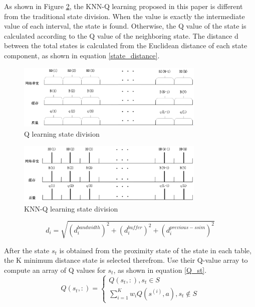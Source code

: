 \documentclass[twocolumn]{article}
\begin{document}
 As shown in Figure \ref{knn-q-learning state}, the KNN-Q learning proposed in this paper is 
 different from the traditional state division. 
 When the value is exactly the intermediate value of each interval, 
 the state is found. Otherwise, the Q value of the state is calculated 
 according to the Q value of the neighboring state.
 The distance d between the total states is calculated from the Euclidean distance of each state component,
  as shown in equation \ref{state_distance}.
\begin{figure}[ht]
\centering
\includegraphics[width=0.8\textwidth]{q-state}
\caption{Q learning state division}
\label{q-learning state}
\end{figure}
\begin{figure}[ht]
\centering
\includegraphics[width=0.8\textwidth]{knn-q-state}
\caption{KNN-Q learning state division}
\label{knn-q-learning state}
\end{figure}
\begin{equation}
\label{state_distance}
d_{i}=\sqrt{(d_{i}^{bandwidth})^2+(d_{i}^{buffer})^2+(d_{i}^{previous-ssim})^2}
\end{equation}

After the state $s_{t}$ is obtained from the proximity state of the state in each table, 
the K minimum distance state is selected therefrom. Use their Q-value array to compute an 
array of Q values for $s_{t}$, as shown in equation \ref{Q_st}.
\begin{equation}
\label{Q_st}
Q(s_{t},:)=\left\{
\begin{array}{lr}
    Q(s_{t},:),s_{t}\in S\\
    \sum_{i=1}^K w_{i}Q(s^{(i)},a),s_{t}\notin S 
\end{array}
\right.
\end{equation}
\end{document}
